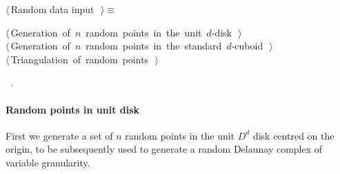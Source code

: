 \documentclass[11pt,oneside]{article}	%
\begin{document}
\begin{flushleft} \small \label{scrap18}
$\langle\,$Random data input\nobreak\ {\footnotesize {}}$\,\rangle\equiv$
\vspace{-1ex}
\begin{list}{}{} \item
\mbox{}\verb@@\hbox{$\langle\,$Generation of $n$ random points in the unit $d$-disk\nobreak\ {\footnotesize {}}$\,\rangle$}\verb@@\\
\mbox{}\verb@@\hbox{$\langle\,$Generation of $n$ random points in the standard $d$-cuboid\nobreak\ {\footnotesize {}}$\,\rangle$}\verb@@\\
\mbox{}\verb@@\hbox{$\langle\,$Triangulation of random points\nobreak\ {\footnotesize {}}$\,\rangle$}\verb@@\\
\mbox{}\verb@@{\NWsep}
\end{list}
\vspace{-1ex}
\footnotesize\addtolength{\baselineskip}{-1ex}
\begin{list}{}{\setlength{\itemsep}{-\parsep}\setlength{\itemindent}{-\leftmargin}}
\item \NWtxtMacroRefIn\ .
\end{list}
\end{flushleft}

\paragraph{Random points in unit disk} 
First we generate a  set of $n$ random points in the unit $D^d$ disk centred on the origin, to be subsequently used to generate a random Delaunay complex of variable granularity.
\end{document}
